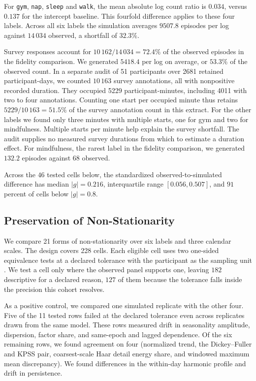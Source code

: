 \documentclass[sigconf]{acmart}
\begin{document}
For \texttt{gym}, \texttt{nap}, \texttt{sleep} and \texttt{walk}, the mean absolute log count ratio is \(0.034\), versus \(0.137\) for the intercept baseline. This fourfold difference applies to these four labels. Across all six labels the simulation averages \(9507.8\) episodes per log against \(14\,034\) observed, a shortfall of \(32.3\%\).

Survey responses account for \(10\,162/14\,034=72.4\%\) of the observed episodes in the fidelity comparison. We generated \(5418.4\) per log on average, or \(53.3\%\) of the observed count. In a separate audit of 51 participants over 2681 retained participant-days, we counted \(10\,163\) survey annotations, all with nonpositive recorded duration. They occupied 5229 participant-minutes, including 4011 with two to four annotations. Counting one start per occupied minute thus retains \(5229/10\,163=51.5\%\) of the survey annotation count in this extract. For the other labels we found only three minutes with multiple starts, one for gym and two for mindfulness. Multiple starts per minute help explain the survey shortfall. The audit supplies no measured survey durations from which to estimate a duration effect. For mindfulness, the rarest label in the fidelity comparison, we generated \(132.2\) episodes against 68 observed.

Across the $46$ tested cells below, the standardized observed-to-simulated difference has median $|g| = 0.216$, interquartile range $[0.056, 0.507]$, and $91$ percent of cells below $|g| = 0.8$.

\subsection{Preservation of Non-Stationarity}
\label{sec:case-study:nonstationarity}

We compare 21 forms of non-stationarity over six labels and three calendar scales. The design covers 228 cells. Each eligible cell uses two one-sided equivalence tests at a declared tolerance with the participant as the sampling unit \citep{lakens_equivalence_2017}. We test a cell only where the observed panel supports one, leaving $182$ descriptive for a declared reason, $127$ of them because the tolerance falls inside the precision this cohort resolves.

As a positive control, we compared one simulated replicate with the other four. Five of the 11 tested rows failed at the declared tolerance even across replicates drawn from the same model. These rows measured drift in seasonality amplitude, dispersion, factor share, and same-epoch and lagged dependence. Of the six remaining rows, we found agreement on four (normalized trend, the Dickey--Fuller and KPSS pair, coarsest-scale Haar detail energy share, and windowed maximum mean discrepancy). We found differences in the within-day harmonic profile and drift in persistence.
\end{document}
